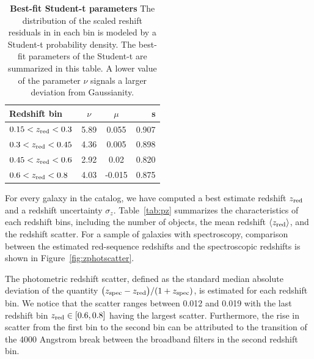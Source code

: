 \documentclass[fleqn,usenatbib,useAMS]{mnras}
\begin{document}
\begin{table}
	\centering
	\caption{{\bf Best-fit Student-t parameters} The distribution of the scaled reshift residuals in in each bin is modeled by a Student-t probability density. The best-fit parameters of the Student-t are summarized in this table. A lower value of the parameter $\nu$ signals a larger deviation from Gaussianity.}
	\label{tab:student-t}
	\begin{tabularx}{0.7\columnwidth}{lccr} %
		\hline
		Redshift bin & $\nu$ & $\mu$ & s \\
		\hline
		$0.15 <z_{\rm red}<0.3$  & 5.89  & 0.055   &  0.907  \\
		$0.3  <z_{\rm red}<0.45$ & 4.36  & 0.005  &  0.898  \\
        $0.45 <z_{\rm red}<0.6$  & 2.92  &  0.02  &  0.820  \\
        $0.6  <z_{\rm red}<0.8$  & 4.03  & -0.015  &  0.875  \\
		\hline
	\end{tabularx}
\end{table}



For every galaxy in the catalog, we have computed a best estimate redshift $z_{\rm red}$ and a redshift uncertainty $\sigma_z$. Table~\ref{tab:pz} summarizes the 
characteristics of each redshift bins, including the number of objects, the mean redshift $\langle z_{\rm red} \rangle$, and the redshift scatter. For a sample of galaxies with spectroscopy, comparison between the estimated red-sequence redshifts and the spectroscopic redshifts is shown in Figure~\ref{fig:zphotscatter}.

The photometric redshift scatter, defined as the standard median absolute deviation of the quantity $\big(z_{\rm spec} - z_{\rm red}\big)/(1+z_{\rm spec})$, is estimated for each redshift bin. We notice that the scatter ranges between 0.012 and 0.019 with the last redshift bin $z_{\rm red} \in [0.6, 0.8]$ having the largest scatter. Furthermore, the rise in scatter from the first bin to the second bin can be attributed to the transition of the 4000 Angstrom break between the broadband filters in the second redshift bin.  
\end{document}
